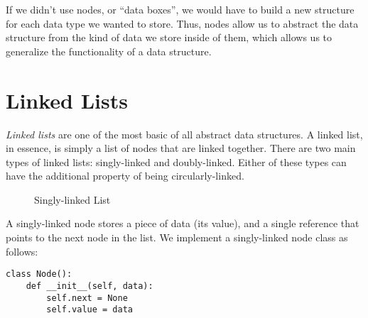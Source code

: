 If we didn't use nodes, or ``data boxes'', we would have to build a new structure for each data type we wanted to store.
Thus, nodes allow us to abstract the data structure from the kind of data we store inside of them, which allows us to generalize the functionality of a data structure.

\section*{Linked Lists}
\emph{Linked lists} are one of the most basic of all abstract data structures.
A linked list, in essence, is simply a list of nodes that are linked together.
There are two main types of linked lists: singly-linked and doubly-linked. Either of these types can have the additional property of being circularly-linked.

\begin{figure}[h]
\centering
{}
\caption{Singly-linked List}
\end{figure}

A singly-linked node stores a piece of data (its value), and a single reference that points to the next node in the list.
We implement a singly-linked node class as follows:

\begin{lstlisting}
class Node():
    def __init__(self, data):
        self.next = None
        self.value = data
\end{lstlisting}

